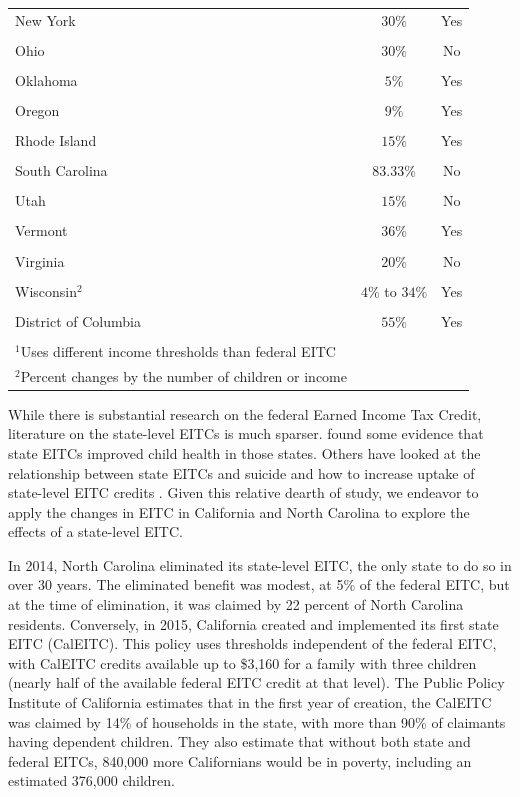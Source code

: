 \documentclass{article}
\begin{document}
\begin{longtable}[h]{lcc}
\\[-1.8ex] 
 New York & $30\%$ & Yes \\
\\[-1.8ex] 
 Ohio & $30\%$ & No \\
\\[-1.8ex] 
 Oklahoma & $5\%$ & Yes \\
\\[-1.8ex] 
 Oregon & $9\%$ & Yes \\
\\[-1.8ex] 
 Rhode Island & $15\%$ & Yes \\
\\[-1.8ex] 
 South Carolina & $83.33\%$ & No \\
\\[-1.8ex] 
 Utah & $15\%$ & No \\
\\[-1.8ex] 
 Vermont & $36\%$ & Yes \\
\\[-1.8ex] 
 Virginia & $20\%$ & No \\
\\[-1.8ex] 
 Wisconsin$^{2}$ & $4\%$ to $34\%$ & Yes \\
\\[-1.8ex] 
 District of Columbia & $55\%$ & Yes \\
 \hline\\[-1.8ex] 
\footnotesize $^{1}$Uses different income thresholds than federal EITC\\
\footnotesize $^{2}$Percent changes by the number of children or income
\label{fig:eitc_states}{}
\end{longtable}



While there is substantial research on the federal Earned Income Tax Credit, literature on the state-level EITCs is much sparser. \cite{baughman2012effects} found some evidence that state EITCs improved child health in those states. Others have looked at the relationship between state EITCs and suicide \citep{lenhart2019effects} and how to increase uptake of state-level EITC credits \citep{linos2020can}. Given this relative dearth of study, we endeavor to apply the changes in EITC in California and North Carolina to explore the effects of a state-level EITC.  

In 2014, North Carolina eliminated its state-level EITC, the only state to do so in over 30 years. The eliminated benefit was modest, at 5\% of the federal EITC, but at the time of elimination, it was claimed by 22 percent of North Carolina residents. Conversely, in 2015, California created and implemented its first state EITC (CalEITC). This policy uses thresholds independent of the federal EITC, with CalEITC credits available up to \$3,160 for a family with three children (nearly half of the available federal EITC credit at that level). The Public Policy Institute of California estimates that in the first year of creation, the CalEITC was claimed by 14\% of households in the state, with more than 90\% of claimants having dependent children. They also estimate that without both state and federal EITCs, 840,000 more Californians would be in poverty, including an estimated 376,000 children.  
\end{document}
